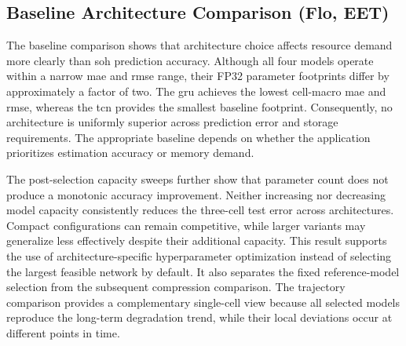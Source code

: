 \documentclass[final,3p,times]{elsarticle}
\begin{document}
\subsection{Baseline Architecture Comparison (Flo, EET)}
The baseline comparison shows that architecture choice affects resource demand more clearly than \ac{soh} prediction accuracy. Although all four models operate within a narrow \ac{mae} and \ac{rmse} range, their FP32 parameter footprints differ by approximately a factor of two. The \ac{gru} achieves the lowest cell-macro \ac{mae} and \ac{rmse}, whereas the \ac{tcn} provides the smallest baseline footprint. Consequently, no architecture is uniformly superior across prediction error and storage requirements. The appropriate baseline depends on whether the application prioritizes estimation accuracy or memory demand.

The post-selection capacity sweeps further show that parameter count does not produce a monotonic accuracy improvement. Neither increasing nor decreasing model capacity consistently reduces the three-cell test error across architectures. Compact configurations can remain competitive, while larger variants may generalize less effectively despite their additional capacity. This result supports the use of architecture-specific hyperparameter optimization instead of selecting the largest feasible network by default. It also separates the fixed reference-model selection from the subsequent compression comparison. The trajectory comparison provides a complementary single-cell view because all selected models reproduce the long-term degradation trend, while their local deviations occur at different points in time.

\end{document}
